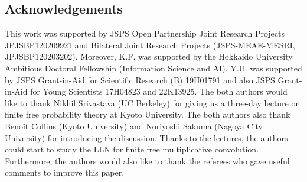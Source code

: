 \documentclass[pdftex]{sigma}
\numberwithin{equation}{section}
\begin{document}
\subsection*{Acknowledgements}

This work was supported by JSPS Open Partnership Joint Research Projects JPJSBP120209921 and Bilateral Joint Research Projects (JSPS-MEAE-MESRI, JPJSBP120203202). Moreover, K.F. was supported by the Hokkaido University Ambitious Doctoral Fellowship (Information Science and AI).
Y.U. was supported by JSPS Grant-in-Aid for Scientific Research (B) 19H01791 and also JSPS Grant-in-Aid for Young Scientists 17H04823 and 22K13925.
The both authors would like to thank Nikhil Srivastava (UC Berkeley) for giving us a three-day lecture on finite free probability theory at Kyoto University.
The both authors also thank Beno\^it Collins (Kyoto University) and Noriyoshi Sakuma (Nagoya City University) for introducing the discussion.
Thanks to the lectures, the authors could start to study the LLN for finite free multiplicative convolution.
Furthermore, the authors would also like to thank the referees who gave useful comments to improve this paper.
\end{document}

